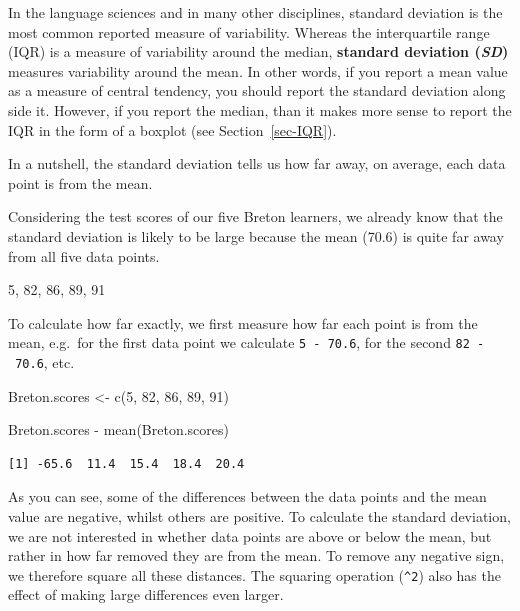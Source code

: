 \documentclass[
  letterpaper,
  DIV=11,
  numbers=noendperiod]{scrreprt}
\newenvironment{Shaded}{\begin{snugshade}}{\end{snugshade}}
\newcommand{\DecValTok}[1]{\textcolor[rgb]{0.68,0.00,0.00}{#1}}
\newcommand{\FunctionTok}[1]{\textcolor[rgb]{0.28,0.35,0.67}{#1}}
\newcommand{\NormalTok}[1]{\textcolor[rgb]{0.00,0.23,0.31}{#1}}
\newcommand{\OtherTok}[1]{\textcolor[rgb]{0.00,0.23,0.31}{#1}}
\newcommand{\SpecialCharTok}[1]{\textcolor[rgb]{0.37,0.37,0.37}{#1}}
\begin{document}
In the language sciences and in many other disciplines, standard
deviation is the most common reported measure of variability. Whereas
the interquartile range (IQR) is a measure of variability around the
median, \textbf{standard deviation (\emph{SD})} measures variability
around the mean. In other words, if you report a mean value as a measure
of central tendency, you should report the standard deviation along side
it. However, if you report the median, than it makes more sense to
report the IQR in the form of a boxplot (see Section~\ref{sec-IQR}).

In a nutshell, the standard deviation tells us how far away, on average,
each data point is from the mean.

Considering the test scores of our five Breton learners, we already know
that the standard deviation is likely to be large because the mean
(70.6) is quite far away from all five data points.

\begin{Shaded}
\begin{Highlighting}[]
\DecValTok{5}\NormalTok{, }\DecValTok{82}\NormalTok{, }\DecValTok{86}\NormalTok{, }\DecValTok{89}\NormalTok{, }\DecValTok{91}
\end{Highlighting}
\end{Shaded}

To calculate how far exactly, we first measure how far each point is
from the mean, e.g.~for the first data point we calculate
\texttt{5\ -\ 70.6}, for the second \texttt{82\ -\ 70.6}, etc.

\begin{Shaded}
\begin{Highlighting}[]
\NormalTok{Breton.scores }\OtherTok{\textless{}{-}} \FunctionTok{c}\NormalTok{(}\DecValTok{5}\NormalTok{, }\DecValTok{82}\NormalTok{, }\DecValTok{86}\NormalTok{, }\DecValTok{89}\NormalTok{, }\DecValTok{91}\NormalTok{)}

\NormalTok{Breton.scores }\SpecialCharTok{{-}} \FunctionTok{mean}\NormalTok{(Breton.scores)}
\end{Highlighting}
\end{Shaded}

\begin{verbatim}
[1] -65.6  11.4  15.4  18.4  20.4
\end{verbatim}

As you can see, some of the differences between the data points and the
mean value are negative, whilst others are positive. To calculate the
standard deviation, we are not interested in whether data points are
above or below the mean, but rather in how far removed they are from the
mean. To remove any negative sign, we therefore square all these
distances. The squaring operation (\texttt{\^{}2}) also has the effect
of making large differences even larger.
\end{document}
